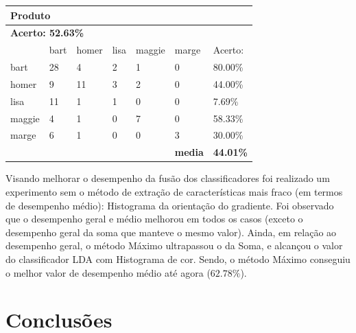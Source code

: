 \documentclass[journal]{IEEEtran}
\begin{document}
\begin{table}[!htb]
\begin{tabular}{l|l|l|l|l|l|l}
\multicolumn{7}{l}{\textbf{Produto}}                                                        \\ \hline
\multicolumn{7}{l}{\textbf{Acerto: 52.63\%}}                                                  \\ \hline
          & bart      & homer     & lisa      & maggie    & marge          & Acerto:            \\ \hline
bart      & 28        & 4         & 2         & 1         & 0              & 80.00\%          \\ \hline
homer     & 9         & 11        & 3         & 2         & 0              & 44.00\%          \\ \hline
lisa      & 11        & 1         & 1         & 0         & 0              & 7.69\%           \\ \hline
maggie    & 4         & 1         & 0         & 7         & 0              & 58.33\%          \\ \hline
marge     & 6         & 1         & 0         & 0         & 3              & 30.00\%          \\ \hline
\textbf{} & \textbf{} & \textbf{} & \textbf{} & \textbf{} & \textbf{media} & \textbf{44.01\%} \\ \hline
\end{tabular}
\end{table}

Visando melhorar o desempenho da fusão dos classificadores foi realizado um experimento sem o método de extração de características mais fraco (em termos de desempenho médio): Histograma da orientação do gradiente.
Foi observado que o desempenho geral e médio melhorou em todos os casos (exceto o desempenho geral da soma que manteve o mesmo valor).
Ainda, em relação ao desempenho geral, o método Máximo ultrapassou o da Soma, e alcançou o valor do classificador LDA com Histograma de cor.
Sendo, o método Máximo conseguiu o melhor valor de desempenho médio até agora ($62.78\%$).

\section{Conclusões}
\end{document}
